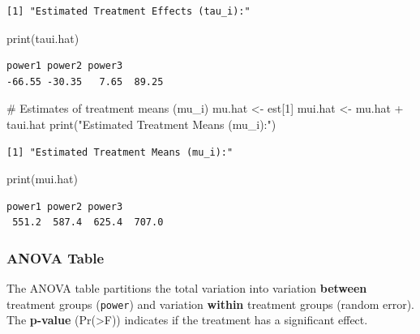 \documentclass[
  letterpaper,
]{scrbook}
\newenvironment{Shaded}{\begin{snugshade}}{\end{snugshade}}
\newcommand{\CommentTok}[1]{\textcolor[rgb]{0.37,0.37,0.37}{#1}}
\newcommand{\DecValTok}[1]{\textcolor[rgb]{0.68,0.00,0.00}{#1}}
\newcommand{\FunctionTok}[1]{\textcolor[rgb]{0.28,0.35,0.67}{#1}}
\newcommand{\NormalTok}[1]{\textcolor[rgb]{0.00,0.23,0.31}{#1}}
\newcommand{\OtherTok}[1]{\textcolor[rgb]{0.00,0.23,0.31}{#1}}
\newcommand{\SpecialCharTok}[1]{\textcolor[rgb]{0.37,0.37,0.37}{#1}}
\newcommand{\StringTok}[1]{\textcolor[rgb]{0.13,0.47,0.30}{#1}}
\begin{document}
\begin{verbatim}
[1] "Estimated Treatment Effects (tau_i):"
\end{verbatim}

\begin{Shaded}
\begin{Highlighting}[]
\FunctionTok{print}\NormalTok{(taui.hat)}
\end{Highlighting}
\end{Shaded}

\begin{verbatim}
power1 power2 power3        
-66.55 -30.35   7.65  89.25 
\end{verbatim}

\begin{Shaded}
\begin{Highlighting}[]
\CommentTok{\# Estimates of treatment means (mu\_i)}
\NormalTok{mu.hat }\OtherTok{\textless{}{-}}\NormalTok{ est[}\DecValTok{1}\NormalTok{]}
\NormalTok{mui.hat }\OtherTok{\textless{}{-}}\NormalTok{ mu.hat }\SpecialCharTok{+}\NormalTok{ taui.hat}
\FunctionTok{print}\NormalTok{(}\StringTok{"Estimated Treatment Means (mu\_i):"}\NormalTok{)}
\end{Highlighting}
\end{Shaded}

\begin{verbatim}
[1] "Estimated Treatment Means (mu_i):"
\end{verbatim}

\begin{Shaded}
\begin{Highlighting}[]
\FunctionTok{print}\NormalTok{(mui.hat)}
\end{Highlighting}
\end{Shaded}

\begin{verbatim}
power1 power2 power3        
 551.2  587.4  625.4  707.0 
\end{verbatim}

\subsubsection{ANOVA Table}\label{anova-table}

The ANOVA table partitions the total variation into variation
\textbf{between} treatment groups (\texttt{power}) and variation
\textbf{within} treatment groups (random error). The \textbf{p-value}
(Pr(\textgreater F)) indicates if the treatment has a significant
effect.
\end{document}

